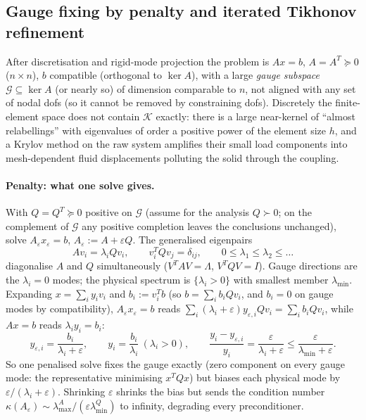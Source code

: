 \documentclass[11pt]{article}
\numberwithin{equation}{section}
\theoremstyle{remark}
\newcommand{\eps}{\varepsilon}
\begin{document}
\subsection{Gauge fixing by penalty and iterated Tikhonov refinement}
\label{sec:tikhonov}

After discretisation and rigid-mode projection the problem is $Ax = b$,
$A = A^T\succeq0$ ($n\times n$), $b$ compatible (orthogonal to $\ker A$),
with a large \emph{gauge subspace} $\mathcal{G}\subseteq\ker A$ (or nearly
so) of dimension comparable to $n$, not aligned with any set of nodal dofs
(so it cannot be removed by constraining dofs). Discretely the
finite-element space does not contain $\mathcal{K}$ exactly: there is a
large near-kernel of ``almost relabellings'' with eigenvalues of order a
positive power of the element size $h$, and a Krylov method on the raw
system amplifies their small load components into mesh-dependent fluid
displacements polluting the solid through the coupling.

\paragraph{Penalty: what one solve gives.} With $Q = Q^T\succeq0$ positive
on $\mathcal{G}$ (assume for the analysis $Q\succ0$; on the complement of
$\mathcal{G}$ any positive completion leaves the conclusions unchanged),
solve $A_\eps x_\eps = b$, $A_\eps := A + \eps Q$. The generalised eigenpairs
\begin{equation}
  Av_i = \lambda_iQv_i, \qquad v_i^TQv_j = \delta_{ij}, \qquad
  0\le\lambda_1\le\lambda_2\le\dots
  \label{eq:gevp}
\end{equation}
diagonalise $A$ and $Q$ simultaneously ($V^TAV = \Lambda$, $V^TQV = I$).
Gauge directions are the $\lambda_i = 0$ modes; the physical spectrum is
$\{\lambda_i > 0\}$ with smallest member $\lambda_{\min}$. Expanding
$x = \sum_iy_iv_i$ and $b_i := v_i^Tb$ (so $b = \sum_ib_iQv_i$, and
$b_i = 0$ on gauge modes by compatibility), $A_\eps x_\eps = b$ reads
$\sum_i(\lambda_i + \eps)y_{\eps,i}Qv_i = \sum_ib_iQv_i$, while $Ax = b$
reads $\lambda_iy_i = b_i$:
\begin{equation}
  y_{\eps,i} = \frac{b_i}{\lambda_i + \eps}, \qquad
  y_i = \frac{b_i}{\lambda_i}\ (\lambda_i > 0), \qquad
  \frac{y_i - y_{\eps,i}}{y_i} = \frac{\eps}{\lambda_i + \eps}
  \le\frac{\eps}{\lambda_{\min} + \eps} .
\end{equation}
So one penalised solve fixes the gauge exactly (zero component on every
gauge mode: the representative minimising $x^TQx$) but biases each physical
mode by $\eps/(\lambda_i + \eps)$. Shrinking $\eps$ shrinks the bias but
sends the condition number $\kappa(A_\eps)\sim\lambda^A_{\max}/
(\eps\lambda^Q_{\min})$ to infinity, degrading every preconditioner.
\end{document}
